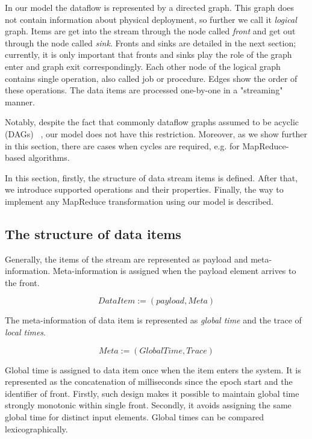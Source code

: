 
\label {fs-model-section}


In our model the dataflow is represented by a directed graph. This graph does not contain information about physical deployment, so further we call it {\it logical} graph. Items are get into the stream through the node called {\it front} and get out through the node called {\it sink}. Fronts and sinks are detailed in the next section; currently, it is only important that fronts and sinks play the role of the graph enter and graph exit correspondingly. Each other node of the logical graph contains single operation, also called job or procedure. Edges show the order of these operations. The data items are processed one-by-one in a "streaming" manner. 

Notably, despite the fact that commonly dataflow graphs assumed to be acyclic (DAGs) 
~\cite{Zaharia:2016:ASU:3013530.2934664, Carbone:2017:SMA:3137765.3137777},
our model does not have this restriction. Moreover, as we show further in this section, there are cases when cycles are required, e.g. for MapReduce-based algorithms. 

In this section, firstly, the structure of data stream items is defined. After that, we introduce supported operations and their properties. Finally, the way to implement any MapReduce transformation using our model is described.

\subsection{The structure of data items}
Generally, the items of the stream are represented as payload and meta-information. Meta-information is assigned when the payload element arrives to the front. 

\[DataItem := (payload, Meta)\]

The meta-information of data item is represented as {\it global time} and the trace of {\it local times}.

\[Meta := (GlobalTime, Trace)\]

Global time is assigned to data item once when the item enters the system. It is represented as the concatenation of milliseconds since the epoch start and the identifier of front. Firstly, such design makes it possible to maintain global time strongly monotonic within single front. Secondly, it avoids assigning the same global time for distinct input elements. Global times can be compared lexicographically.


